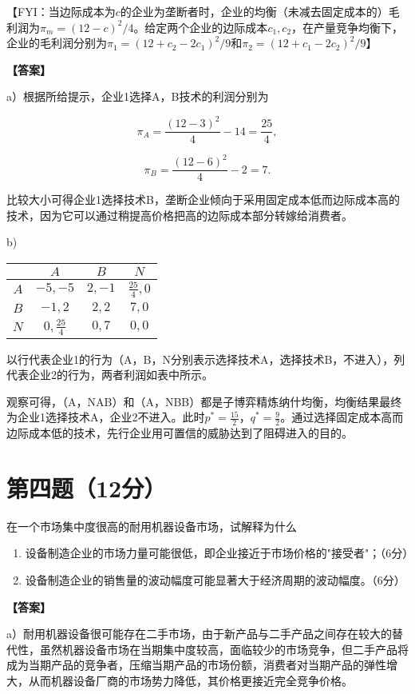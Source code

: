 \documentclass[12pt]{article}
\begin{document}
【FYI：当边际成本为$c$的企业为垄断者时，企业的均衡（未减去固定成本的）毛利润为$\pi_m=(12-c)^2/4$。给定两个企业的边际成本$c_1,c_2$，在产量竞争均衡下，企业的毛利润分别为$\pi_1=(12+c_2-2c_1)^2/9$和$\pi_2=(12+c_1-2c_2)^2/9$】

\noindent\textbf{【答案】}

a）根据所给提示，企业1选择A，B技术的利润分别为

$$\pi_A=\frac{(12-3)^2}{4}-14=\frac{25}{4},$$

$$\pi_B=\frac{(12-6)^2}{4}-2=7.$$

比较大小可得企业1选择技术B，垄断企业倾向于采用固定成本低而边际成本高的技术，因为它可以通过稍提高价格把高的边际成本部分转嫁给消费者。

b)

\begin{center}
\begin{tabular}{c|ccc}
 & $A$ & $B$ & $N$ \\
\hline
$A$ & $-5,-5$ & $2,-1$ & $\frac{25}{4},0$ \\
$B$ & $-1,2$ & $2,2$ & $7,0$ \\
$N$ & $0,\frac{25}{4}$ & $0,7$ & $0,0$ \\
\end{tabular}
\end{center}

以行代表企业1的行为（A，B，N分别表示选择技术A，选择技术B，不进入），列代表企业2的行为，两者利润如表中所示。

观察可得，（A，NAB）和（A，NBB）都是子博弈精炼纳什均衡，均衡结果最终为企业1选择技术A，企业2不进入。此时$p^*=\frac{15}2$，$q^*=\frac92$。通过选择固定成本高而边际成本低的技术，先行企业用可置信的威胁达到了阻碍进入的目的。

\section*{第四题（12分）}
在一个市场集中度很高的耐用机器设备市场，试解释为什么

\begin{enumerate}
\item 设备制造企业的市场力量可能很低，即企业接近于市场价格的"接受者"；（6分）

\item 设备制造企业的销售量的波动幅度可能显著大于经济周期的波动幅度。（6分）
\end{enumerate}

\noindent\textbf{【答案】}

a）耐用机器设备很可能存在二手市场，由于新产品与二手产品之间存在较大的替代性，虽然机器设备市场在当期集中度较高，面临较少的市场竞争，但二手产品将成为当期产品的竞争者，压缩当期产品的市场份额，消费者对当期产品的弹性增大，从而机器设备厂商的市场势力降低，其价格更接近完全竞争价格。
\end{document}
